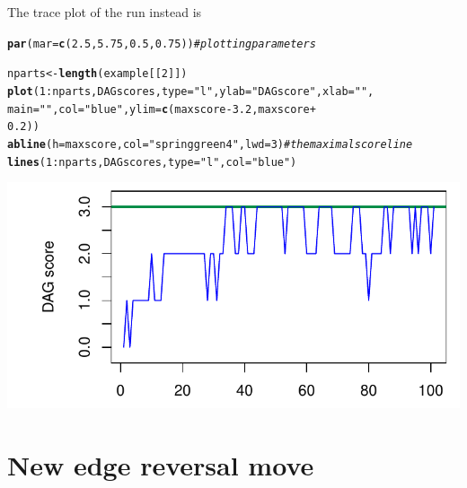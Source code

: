 \documentclass[a4paper]{article}\usepackage[]{graphicx}\usepackage[]{color}
\makeatletter
\def\maxwidth{ %
  \ifdim\Gin@nat@width>\linewidth
    \linewidth
  \else
    \Gin@nat@width
  \fi
}
\newcommand{\hlnum}[1]{\textcolor[rgb]{0.686,0.059,0.569}{#1}}%
\newcommand{\hlstr}[1]{\textcolor[rgb]{0.192,0.494,0.8}{#1}}%
\newcommand{\hlcom}[1]{\textcolor[rgb]{0.678,0.584,0.686}{\textit{#1}}}%
\newcommand{\hlopt}[1]{\textcolor[rgb]{0,0,0}{#1}}%
\newcommand{\hlstd}[1]{\textcolor[rgb]{0.345,0.345,0.345}{#1}}%
\newcommand{\hlkwb}[1]{\textcolor[rgb]{0.69,0.353,0.396}{#1}}%
\newcommand{\hlkwc}[1]{\textcolor[rgb]{0.333,0.667,0.333}{#1}}%
\newcommand{\hlkwd}[1]{\textcolor[rgb]{0.737,0.353,0.396}{\textbf{#1}}}%
\newenvironment{kframe}{%
 \def\at@end@of@kframe{}%
 \ifinner\ifhmode%
  \def\at@end@of@kframe{\end{minipage}}%
  \begin{minipage}{\columnwidth}%
 \fi\fi%
 \def\FrameCommand##1{\hskip\@totalleftmargin \hskip-\fboxsep
 \colorbox{shadecolor}{##1}\hskip-\fboxsep
     \hskip-\linewidth \hskip-\@totalleftmargin \hskip\columnwidth}%
 \MakeFramed {\advance\hsize-\width
   \@totalleftmargin\z@ \linewidth\hsize
   \@setminipage}}%
 {\par\unskip\endMakeFramed%
 \at@end@of@kframe}
\newenvironment{knitrout}{}{} %
\newcommand{\nn}{\noindent}
\makeatother
\begin{document}
\nn The trace plot of the run instead is

\begin{knitrout}
\color{fgcolor}\begin{kframe}
\begin{alltt}
\hlkwd{par}\hlstd{(}\hlkwc{mar} \hlstd{=} \hlkwd{c}\hlstd{(}\hlnum{2.5}\hlstd{,} \hlnum{5.75}\hlstd{,} \hlnum{0.5}\hlstd{,} \hlnum{0.75}\hlstd{))}  \hlcom{# plotting parameters}

\hlstd{nparts} \hlkwb{<-} \hlkwd{length}\hlstd{(example[[}\hlnum{2}\hlstd{]])}
\hlkwd{plot}\hlstd{(}\hlnum{1}\hlopt{:}\hlstd{nparts, DAGscores,} \hlkwc{type} \hlstd{=} \hlstr{"l"}\hlstd{,} \hlkwc{ylab} \hlstd{=} \hlstr{"DAG score"}\hlstd{,} \hlkwc{xlab} \hlstd{=} \hlstr{""}\hlstd{,}
    \hlkwc{main} \hlstd{=} \hlstr{""}\hlstd{,} \hlkwc{col} \hlstd{=} \hlstr{"blue"}\hlstd{,} \hlkwc{ylim} \hlstd{=} \hlkwd{c}\hlstd{(maxscore} \hlopt{-} \hlnum{3.2}\hlstd{, maxscore} \hlopt{+}
        \hlnum{0.2}\hlstd{))}
\hlkwd{abline}\hlstd{(}\hlkwc{h} \hlstd{= maxscore,} \hlkwc{col} \hlstd{=} \hlstr{"springgreen4"}\hlstd{,} \hlkwc{lwd} \hlstd{=} \hlnum{3}\hlstd{)}  \hlcom{# the maximal score line}
\hlkwd{lines}\hlstd{(}\hlnum{1}\hlopt{:}\hlstd{nparts, DAGscores,} \hlkwc{type} \hlstd{=} \hlstr{"l"}\hlstd{,} \hlkwc{col} \hlstd{=} \hlstr{"blue"}\hlstd{)}
\end{alltt}
\end{kframe}

{\centering \includegraphics[width=\maxwidth]{figure/minimal-unnamed-chunk-11-1} 

}



\end{knitrout}

\section{New edge reversal move}
\end{document}
